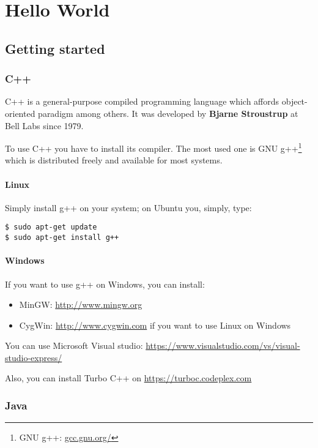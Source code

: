 \documentclass{KodeBook}
\begin{document}
	\chapter{Hello World}
\fi



\section{Getting started}

\subsection{C++}

C++ is a general-purpose compiled programming language which affords object-oriented paradigm among others. 
It was developed by \textbf{Bjarne Stroustrup} at Bell Labs since 1979.

To use C++ you have to install its compiler. 
The most used one is GNU g++\footnote{GNU g++: \url{gcc.gnu.org/}} which is distributed freely and available for most systems.

\subsubsection{Linux}
Simply install g++ on your system; on Ubuntu you, simply, type:
\begin{lstlisting}[style=shellStyle]
$ sudo apt-get update
$ sudo apt-get install g++
\end{lstlisting}

\subsubsection{Windows}

If you want to use g++ on Windows, you can install:
\begin{itemize}
	\item MinGW: \url{http://www.mingw.org} 
	\item CygWin: \url{http://www.cygwin.com} if you want to use Linux on Windows
\end{itemize}

You can use Microsoft Visual studio: \url{https://www.visualstudio.com/vs/visual-studio-express/}

Also, you can install Turbo C++ on \url{https://turboc.codeplex.com}

\subsection{Java}
\end{document}
